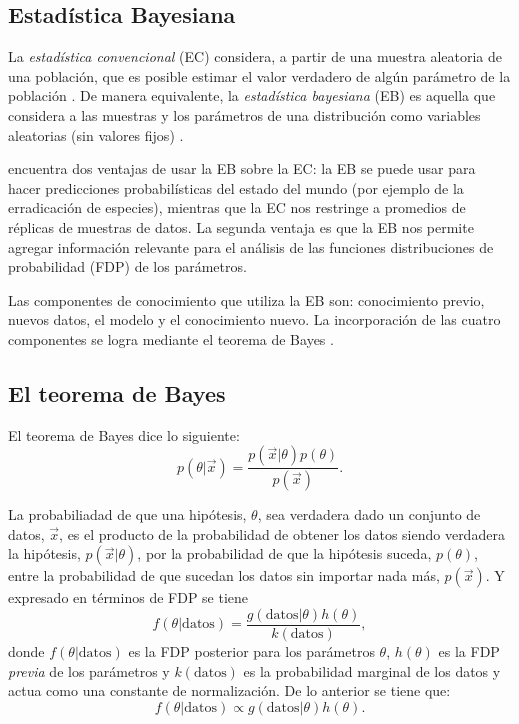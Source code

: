 \documentclass{article}
\begin{document}
\subsection*{Estad\'istica Bayesiana}
La {\it estad\'istica convencional} (EC) considera, a partir de una muestra
aleatoria de una poblaci\'on, que es posible estimar el valor verdadero de
alg\'un par\'ametro de la poblaci\'on \citep{Ellison1996}. De manera equivalente,
la {\it estad\'istica bayesiana} (EB) es aquella que considera a las muestras
y los par\'ametros de una distribuci\'on como variables aleatorias (sin valores
fijos) \citep{Gilks1996}.

\cite{McCarthy2007} encuentra dos ventajas de usar la EB
sobre la EC: la EB se puede usar para hacer predicciones
probabil\'isticas del estado del mundo (por ejemplo de la erradicaci\'on de
especies), mientras que la EC nos restringe a promedios de r\'eplicas de muestras
de datos. La segunda ventaja es que la EB nos permite agregar informaci\'on
relevante para el an\'alisis de las funciones distribuciones de probabilidad
(FDP) de los par\'ametros.

Las componentes de conocimiento que utiliza la EB son: conocimiento previo,
nuevos datos, el modelo y el conocimiento nuevo. La incorporaci\'on de las
cuatro componentes se logra mediante el teorema de Bayes \citep{McCarthy2007}.
\subsection*{El teorema de Bayes}
El teorema de Bayes dice lo siguiente:
\begin{equation}\label{ecTBayes}
p(\theta |\vec x) = \frac{p(\vec x |\theta)p(\theta)}{p(\vec x)}.
\end{equation}

La probabiliadad de que una hip\'otesis, $\theta$, sea verdadera dado un
conjunto de datos, $\vec x$, es el producto de la probabilidad de obtener los
datos siendo verdadera la hip\'otesis, $p(\vec x|\theta)$, por la probabilidad
de que la hip\'otesis suceda, $p(\theta)$, entre la probabilidad de que sucedan
los datos sin importar nada m\'as, $p(\vec x)$. Y expresado en t\'erminos de
FDP \citep{Lynch2007} se tiene
\begin{equation}\label{ecTBayesDistribuciones}
f(\theta |\mbox{datos}) = \frac{g(\mbox{datos} |\theta)h(\theta)}{k(\mbox{datos})},
\end{equation}
donde $f(\theta |\mbox{datos})$ es la FDP posterior para los
par\'ametros $\theta$, $h(\theta)$ es la FDP {\it previa} de los
par\'ametros y $k(\mbox{datos})$ es la probabilidad marginal de los datos y
actua como una constante de normalizaci\'on. De lo anterior se tiene que:
\begin{equation}\label{ecTBayesProp}
f(\theta |\mbox{datos}) \propto g(\mbox{datos} |\theta)h(\theta).
\end{equation}
\end{document}
